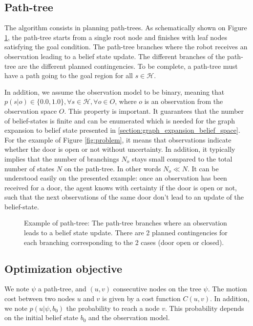 \documentclass[letterpaper, 10 pt, conference]{ieeeconf}  %
\begin{document}
\subsection{Path-tree}
The algorithm consists in planning path-trees. As schematically shown on Figure \ref{fig:path_tree}, the path-tree starts from a single root node and finishes with leaf nodes satisfying the goal condition. The path-tree branches where the robot receives an observation leading to a belief state update. The different branches of the path-tree are the different planned contingencies. To be complete, a path-tree must have a path going to the goal region for all $s \in \mathcal{H}$.

In addition, we assume the observation model to be binary, meaning that $p(s|o) \in \{0.0, 1.0\}, \forall s \in \mathcal{H}, \forall o \in O$, where $o$ is an observation from the observation space $O$. This property is important. It guarantees that the number of belief-states is finite and can be enumerated which is needed for
the graph expansion to belief state presented in \ref{section:graph_expansion_belief_space}. For the example of Figure \ref{fig:problem}, it means that observations indicate whether the door is open or not without uncertainty. In addition, it typically implies that the number of branchings $N_o$ stays small compared to the total number of states $N$ on the path-tree. In other words $N_o \ll N$. It can be understood easily on the presented example: once an observation has been received for a door, the agent knows with certainty if the door is open or not, such that the next observations of the same door don't lead to an update of the belief-state.

\begin{figure}[!htb]
 \caption{Example of path-tree: The path-tree branches where an observation leads to a belief state update. There are 2 planned contingencies for each branching corresponding to the 2 cases (door open or closed).}
 \label{fig:path_tree}
\end{figure}

\subsection{Optimization objective}
We note $\psi$ a path-tree, and $(u, v)$ consecutive nodes on the tree $\psi$. The motion cost between two nodes $u$ and $v$ is given by a cost function $C(u, v)$. In addition, we note $p(u | \psi, b_0)$ the probability to reach a node $v$. This probability depends on the initial belief state $b_0$ and the observation model. 
\end{document}
